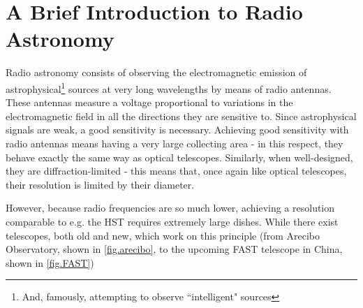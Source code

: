 

%
%

\section{A Brief Introduction to Radio Astronomy}
\pg
Radio astronomy consists of observing the electromagnetic emission of astrophysical\footnote{And, famously, attempting to observe ``intelligent" sources } sources at very long wavelengths by means of radio antennas. These antennas measure a voltage proportional to variations in the electromagnetic field in all the directions they are sensitive to. Since astrophysical signals are weak, a good sensitivity is necessary. Achieving good sensitivity with radio antennas means having a very large collecting area - in this respect, they behave exactly the same way as optical telescopes. Similarly, when well-designed, they are diffraction-limited - this means that, once again like optical telescopes, their resolution is limited by their diameter.

\pg
However, because radio frequencies are so much lower, achieving a resolution comparable to e.g. the HST requires extremely large dishes. While there exist telescopes, both old and new, which work on this principle (from Arecibo Observatory, shown in \cref{fig.arecibo}, to the upcoming FAST telescope in China, shown in \cref{fig.FAST})

